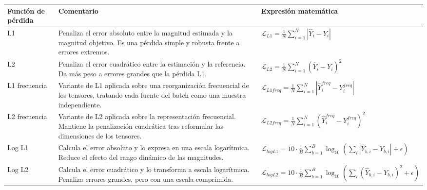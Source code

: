 \begin{table}[H]
    \centering
    \small
    \begin{adjustbox}{max width=\textwidth}
        \begin{tabular}{p{} p{} p{}}
            \toprule
            \textbf{Función de pérdida} & \textbf{Comentario} & \textbf{Expresión matemática} \\
            \midrule

            L1 &
            Penaliza el error absoluto entre la magnitud estimada y la magnitud objetivo. Es una pérdida simple y robusta frente a errores extremos. &
            \( \mathcal{L}_{L1} = \frac{1}{N}\sum_{i=1}^{N} |\hat{Y}_i - Y_i| \)
            \\

            L2 &
            Penaliza el error cuadrático entre la estimación y la referencia. Da más peso a errores grandes que la pérdida L1. &
            \( \mathcal{L}_{L2} = \frac{1}{N}\sum_{i=1}^{N} (\hat{Y}_i - Y_i)^2 \)
            \\

            L1 frecuencia &
            Variante de L1 aplicada sobre una reorganización frecuencial de los tensores, tratando cada fuente del batch como una muestra independiente. &
            \( \mathcal{L}_{L1freq} = \frac{1}{N}\sum_{i=1}^{N} |\hat{Y}^{freq}_i - Y^{freq}_i| \)
            \\

            L2 frecuencia &
            Variante de L2 aplicada sobre la representación frecuencial. Mantiene la penalización cuadrática tras reformular las dimensiones de los tensores. &
            \( \mathcal{L}_{L2freq} = \frac{1}{N}\sum_{i=1}^{N} (\hat{Y}^{freq}_i - Y^{freq}_i)^2 \)
            \\

            Log L1 &
            Calcula el error absoluto y lo expresa en una escala logarítmica. Reduce el efecto del rango dinámico de las magnitudes. &
            \( \mathcal{L}_{logL1} = 10 \cdot \frac{1}{B}\sum_{b=1}^{B}\log_{10}\left(\sum_i |\hat{Y}_{b,i}-Y_{b,i}|+\epsilon\right) \)
            \\

            Log L2 &
            Calcula el error cuadrático y lo transforma a escala logarítmica. Penaliza errores grandes, pero con una escala comprimida. &
            \( \mathcal{L}_{logL2} = 10 \cdot \frac{1}{B}\sum_{b=1}^{B}\log_{10}\left(\sum_i (\hat{Y}_{b,i}-Y_{b,i})^2+\epsilon\right) \)
            \\


\end{tabular}
\end{adjustbox}
\end{table}
